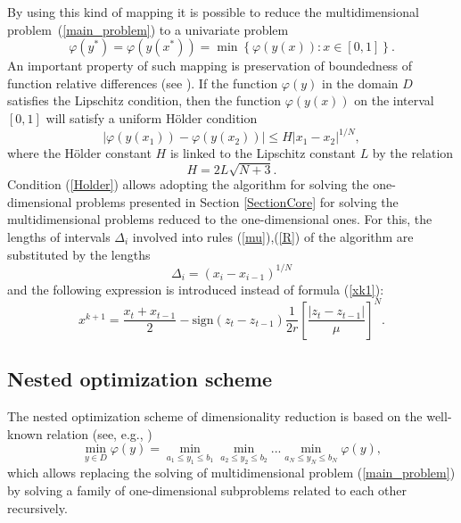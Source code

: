 \documentclass[runningheads]{llncs}
\begin{document}
By using this kind of mapping it is possible to reduce the multidimensional 
problem~(\ref{main_problem}) to a univariate problem
\begin{equation}
\varphi(y^\ast)=\varphi(y(x^\ast))=\min{\left\{\varphi(y(x)): x\in[0,1]
\right\}}.
\end{equation}
An important property of such mapping is preservation of boundedness of 
function relative differences (see \cite{Sergeyev2013,Strongin2000}). If the 
function $\varphi(y)$ in the domain $D$ satisfies the Lipschitz condition, 
then the function $\varphi(y(x))$ on the interval $[0,1]$ will satisfy a 
uniform H{\"o}lder condition
\begin{equation}\label{Holder}
\left|\varphi(y(x_1))-\varphi(y(x_2))\right|\leq H\left|x_1-x_2\right|^{1/N},
\end{equation}
where the H{\"o}lder constant $H$ is linked to the Lipschitz constant $L$ by 
the relation
\begin{equation}
H=2L\sqrt{N+3}.
\end{equation}
Condition (\ref{Holder}) allows adopting the algorithm for solving the 
one-dimensional problems presented in Section \ref{SectionCore} for solving the 
multidimensional problems reduced to the one-dimensional ones. For this, the 
lengths of intervals $\Delta_i$  involved into rules (\ref{mu}),(\ref{R}) of the
algorithm are substituted by the lengths 
\begin{equation}
\Delta_i=\left(x_i-x_{i-1}\right)^{1/N}
\end{equation}
and the following expression is introduced instead of formula (\ref{xk1}):
\begin{equation}
x^{k+1} = \frac{x_t+x_{t-1}}{2} - \mathrm{sign}(z_t-z_{t-1})\frac{1}{2r}
\left[\frac{\left|z_t-z_{t-1}\right|}{\mu}\right]^N.
\end{equation}

\subsection{Nested optimization scheme}

The nested optimization scheme of dimensionality reduction is based on the 
well-known relation (see, e.g., \cite{Carr1964})
\begin{equation}\label{nested}
\min_{y \in D}\varphi(y) = \min_{a_1\leq y_1 \leq b_1}\min_{a_2\leq y_2 \leq 
b_2}...\min_{a_N\leq y_N \leq b_N}\varphi(y),
\end{equation}
which allows replacing the solving of multidimensional problem 
(\ref{main_problem}) by solving a family of one-dimensional subproblems 
related to each other recursively.
\end{document}
